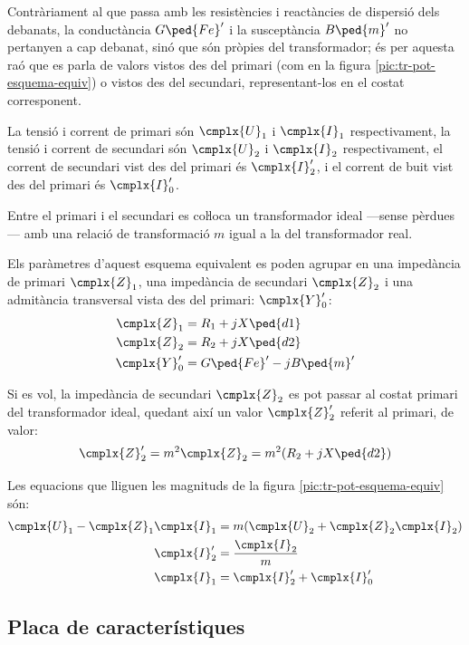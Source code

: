 Contràriament al que passa amb les resistències i reactàncies de dispersió dels debanats, la conductància $G\ped{Fe}'$ i la susceptància $B\ped{m}'$ no pertanyen a cap debanat, sinó que són pròpies del transformador; és per aquesta raó que es parla de valors vistos des del primari (com en la figura \vref{pic:tr-pot-esquema-equiv}) o vistos des del secundari, representant-los en el costat corresponent.

La tensió i corrent de primari són $\cmplx{U}_1$ i $\cmplx{I}_1$ respectivament, la tensió i corrent de secundari són $\cmplx{U}_2$ i $\cmplx{I}_2$ respectivament, el corrent de secundari vist des del primari és $\cmplx{I}_2'$, i el corrent de buit vist des del primari és $\cmplx{I}_0'$.

Entre el primari i el secundari es coŀloca un transformador ideal ---sense pèrdues--- amb una relació de transformació $m$ igual a la del transformador real.

Els paràmetres d'aquest esquema equivalent es poden agrupar en una impedància de primari $\cmplx{Z}_1$, una impedància de secundari $\cmplx{Z}_2$ i una  admitància transversal vista des del primari: $\cmplx{Y}_0'$:
\begin{align}
    \cmplx{Z}_1 &= R_1 + j X\ped{d1} \\
    \cmplx{Z}_2 &= R_2 + j X\ped{d2}\\
    \cmplx{Y}_0' &= G\ped{Fe}'- j B\ped{m}'
\end{align}

Si es vol, la impedància de secundari $\cmplx{Z}_2$ es pot passar al costat primari del transformador ideal, quedant així un valor $\cmplx{Z}_2'$ referit al primari, de valor:
\begin{equation}
    \cmplx{Z}_2' = m^2 \cmplx{Z}_2 =  m^2 (R_2 + j X\ped{d2})
\end{equation}

Les equacions que lliguen les magnituds de la figura \vref{pic:tr-pot-esquema-equiv} són:
\begin{align}
    \cmplx{U}_1 - \cmplx{Z}_1 \cmplx{I}_1 &= m ( \cmplx{U}_2  + \cmplx{Z}_2 \cmplx{I}_2 ) \\
    \cmplx{I}_2' &=   \frac{\cmplx{I}_2}{m} \\
    \cmplx{I}_1  &=   \cmplx{I}_2' + \cmplx{I}_0'
\end{align}


\subsection{Placa de característiques}

